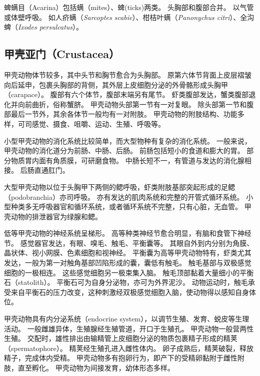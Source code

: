\documentclass[11pt]{article}
\begin{document}
\newline

蜱螨目（Acarina）包括螨（mites）、蜱(ticks)两类。
头胸部和腹部合并。
以气管或体壁呼吸。
如人疥螨（\textit{Sarcoptes scabie}）、柑桔叶螨（\textit{Panonychus citri}）、全沟蜱（\textit{Ixodes persulcatus}）。

\subsection{甲壳亚门（Crustacea）}
甲壳动物体节较多，其中头节和胸节愈合为头胸部。
原第六体节背面上皮层褶皱向后延申，包裹头胸部的背侧，其外层上皮细胞分泌的外骨骼形成头胸甲（carapace）。
腹部有六个体节，腹部末端另有尾节。
虾类腹部发达，蟹类腹部退化并向前曲折，俗称蟹脐。
甲壳动物头部第一节有一对复眼。
除头部第一节和腹部最后一节外，其余各体节一般均有一对附肢。
甲壳动物的附肢结构、功能多样，可司感觉、摄食、咀嚼、运动、生殖、呼吸等。

\newline

小型甲壳动物的消化系统比较简单，而大型物种有复杂的消化系统。
一般来说，甲壳动物的消化道分为前肠、中肠、后肠。
前肠包括短小的食道和膨大的胃。
部分物质胃内面有角质膜，可研磨食物。
中肠长短不一，有管道与发达的消化腺相接。
后肠直通肛门。

\newline

大型甲壳动物以位于头胸甲下两侧的鳃呼吸，虾类附肢基部突起形成的足鳃（podobranchia）亦司呼吸。
亦有发达的肌肉系统和完整的开管式循环系统。
小型种类多无呼吸器官和循环系统，或者循环系统不完整，只有心脏，无血管。
甲壳动物的排泄器官为绿腺和鳃。

\newline

低等甲壳动物的神经系统呈梯形。
高等种类神经节愈合明显，有脑和食管下神经节。
感觉器官发达，有眼、嗅毛、触毛、平衡囊等。
其眼自外到内分别为角膜、晶状体、视小网膜、色素细胞和视神经。
平衡囊为高等甲壳动物特有，虾类尤其发达，一般为第一对触角基部凹陷形成的囊，囊低有触毛。
触毛基部与双极感觉细胞的一极相连。
这些感觉细胞另一极束集入脑。
触毛顶部黏着大量细小的平衡石（statolith）。
平衡石可为自身分泌物，亦可为外界泥沙。
动物运动时，触毛承受来自平衡石的压力改变，这种刺激经双极感觉细胞入脑，使动物得以感知自身体位。

\newline

甲壳动物具有内分泌系统（endocrine system），以调节生殖、发育、蜕皮等生理活动。
一般雌雄异体，生殖腺经生殖管道，开口于生殖孔。
甲壳动物一般营两性生殖。
交配时，雄性排出由输精管上皮细胞分泌的物质包裹精子形成的精荚（spermatophore）。
精荚经生殖孔进入雌性体内。
卵子成熟后，精荚破裂，释放精子，完成体内受精。
甲壳动物多有抱卵行为，即产下的受精卵黏附于雌性附肢，直至孵化。
甲壳动物为间接发育，幼体形态多样。
\end{document}
